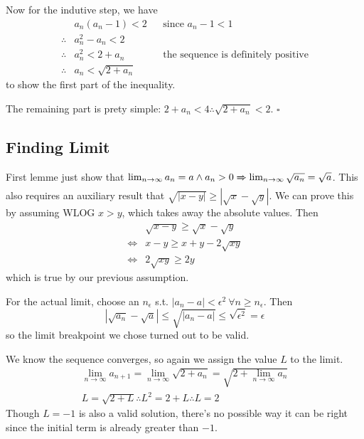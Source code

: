 \documentclass[12pt]{article}
\newcommand{\ra}{\xRightarrow}
\begin{document}
Now for the indutive step, we have
\begin{align*}
               & a_n(a_n - 1) < 2   &  & \text{since $a_n-1 < 1$}                   \\
  \therefore{} & a_n^2 - a_n < 2                                                    \\
  \therefore{} & a_n^2 < 2+a_n      &  & \text{the sequence is definitely positive} \\
  \therefore{} & a_n < \sqrt{2+a_n}
\end{align*}
to show the first part of the inequality.

The remaining part is prety simple: $2+a_n < 4 \therefore \sqrt{2+a_n} < 2$. $\square$

\subsection{Finding Limit} \label{sec:sqrtlim}

First lemme just show that $\lim_{n \to \infty} a_n=a \land a_n > 0 \ra{} \lim_{n \to \infty} \sqrt{a_n}=\sqrt{a}$.
This also requires an auxiliary result that $\sqrt{|x-y|} \ge \left|\sqrt{x}-\sqrt{y}\right|$.
We can prove this by assuming WLOG $x > y$, which takes away the absolute values.
Then
\begin{align*}
         & \sqrt{x-y} \ge \sqrt{x}-\sqrt{y} \\
  \iff{} & x-y \ge x+y-2\sqrt{xy}           \\
  \iff{} & 2\sqrt{xy} \ge 2y
\end{align*}
which is true by our previous assumption.

For the actual limit, choose an $n_\epsilon$ s.t. $|a_n-a| < \epsilon^2\ \forall n \ge n_\epsilon$.
Then
\[\left|\sqrt{a_n}-\sqrt{a}\right| \le \sqrt{|a_n-a|} \le \sqrt{\epsilon^2}=\epsilon\]
so the limit breakpoint we chose turned out to be valid.

We know the sequence converges, so again we assign the value $L$ to the limit.
\begin{gather*}
  \lim_{n \to \infty} a_{n+1} = \lim_{n \to \infty} \sqrt{2+a_n} = \sqrt{2+\lim_{n \to \infty} a_n} \\
  L=\sqrt{2+L} \therefore L^2=2+L \therefore L=\boxed{2}
\end{gather*}
Though $L=-1$ is also a valid solution, there's no possible way it can
be right since the initial term is already greater than $-1$.

\pagebreak
\end{document}
